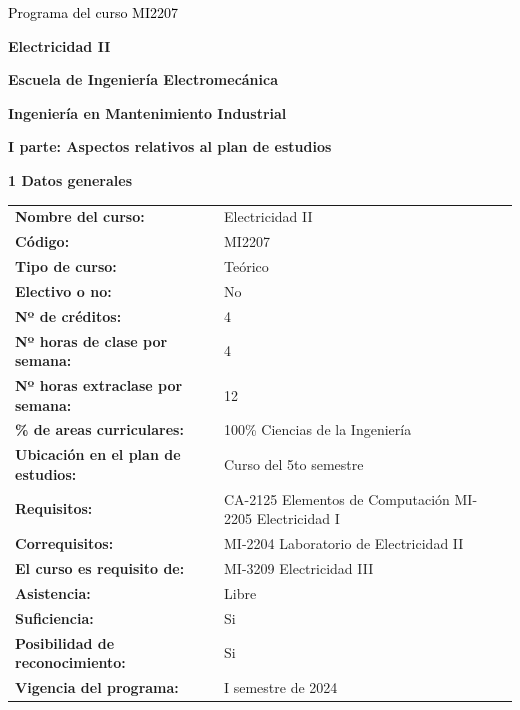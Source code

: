 \documentclass[letterpaper]{article}%
\begin{document}
%
\normalsize%
\thispagestyle{empty}%
%
\vspace*{150mm}%
\par\fontsize{14}{0}\selectfont \textcolor{black}{Programa del curso MI2207}%
\par\fontsize{18}{25}\selectfont \textbf{\textcolor{azulsuaveTEC}{Electricidad II}}%
\par\hspace*{10mm}\fontsize{12}{30}\selectfont \textbf{\textcolor{gris}{Escuela de Ingeniería Electromecánica}}%
\par\hspace*{10mm}\fontsize{12}{14}\selectfont \textbf{\textcolor{gris}{Ingeniería en Mantenimiento Industrial}}%
\newpage%
\pagestyle{headfoot}%
\par\fontsize{14}{0}\selectfont \textbf{\textcolor{parte}{I parte: Aspectos relativos al plan de estudios}}%
\par\hspace*{4mm}\fontsize{12}{20}\selectfont \textbf{\textcolor{parte}{1 Datos generales}}%
\renewcommand{\arraystretch}{1.5}%
\begin{longtable}{m{7cm}m{9cm}}%
\textbf{Nombre del curso:}&Electricidad II\\%
\textbf{Código:}&MI2207\\%
\textbf{Tipo de curso:}&Teórico\\%
\textbf{Electivo o no:}&No\\%
\textbf{Nº de créditos:}&4\\%
\textbf{Nº horas de clase por semana:}&4\\%
\textbf{Nº horas extraclase por semana:}&12\\%
\textbf{\% de areas curriculares:}&100\% Ciencias de la Ingeniería\\%
\textbf{Ubicación en el plan de estudios:}&Curso del 5to semestre\\%
\textbf{Requisitos:}&CA{-}2125 Elementos de Computación
\newline%
MI{-}2205 Electricidad I\\%
\textbf{Correquisitos:}&MI{-}2204 Laboratorio de Electricidad II\\%
\textbf{El curso es requisito de:}&MI{-}3209 Electricidad III\\%
\textbf{Asistencia:}&Libre\\%
\textbf{Suficiencia:}&Si\\%
\textbf{Posibilidad de reconocimiento:}&Si\\%
\textbf{Vigencia del programa:}&I semestre de 2024\\%
\end{longtable}%
\end{document}
